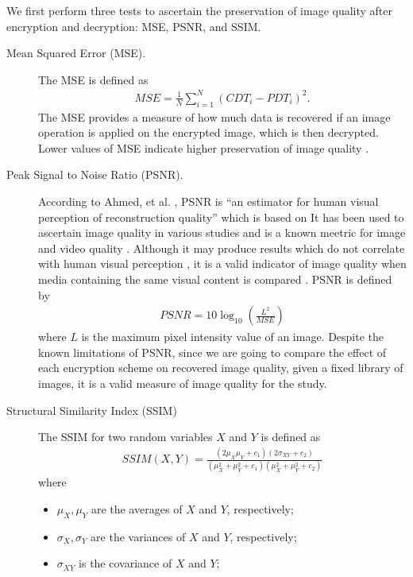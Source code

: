 We first perform three tests to ascertain the preservation of image quality after encryption and decryption: MSE, PSNR, and SSIM.
\begin{description}
	\item [Mean Squared Error (MSE).] The MSE is defined \cite{ahmed_benchmark_2016} as
	\begin{align}
		MSE = \frac{1}{N}\sum_{i=1}^{N}{(CDT_i - PDT_i)^2}.
	\end{align}
	The MSE provides a measure of how much data is recovered if an image operation is applied on the encrypted image, which is then decrypted. Lower values of MSE indicate higher preservation of image quality \cite{ahmed_benchmark_2016, ahmad_efficiency_2012}.
	\item [Peak Signal to Noise Ratio (PSNR).]
	According to Ahmed, et al. \cite{ahmed_benchmark_2016}, PSNR is ``an estimator for human visual perception of reconstruction quality'' which is based on  It has been used to ascertain image quality in various studies and is a known meetric for image and video quality \cite{upmanyu_efficient_2009, ahmed_benchmark_2016, akramullah_video_2014}. Although it may produce results which do not correlate with human visual perception \cite{huynh-thu_accuracy_2012, ahmed_benchmark_2016}, it is a valid indicator of image quality when media containing the same visual content is compared \cite{huynh-thu_accuracy_2012}.
	PSNR is defined by
	\begin{align}
		PSNR = 10\log_{10}{\left( \frac{L^2}{MSE} \right)}
	\end{align}
	where $L$ is the maximum pixel intensity value of an image.
	Despite the known limitations of PSNR, since we are going to compare the effect of each encryption scheme on recovered image quality, given a fixed library of images, it is a valid measure of image quality for the study.
	\item [Structural Similarity Index (SSIM)]
	The SSIM for two random variables $X$ and $Y$ is defined \cite{ahmed_benchmark_2016, akramullah_video_2014} as
	\begin{align}
		SSIM(X,Y) = \frac{(2\mu_X\mu_Y+c_1)(2\sigma_{XY}+c_2)}{(\mu_X^2+\mu_Y^2+c_1)(\mu_X^2+\mu_Y^2+c_2)}
	\end{align}
	where
	\begin{itemize}
		\item $\mu_X, \mu_Y$ are the averages of $X$ and $Y$, respectively;
		\item $\sigma_X, \sigma_Y$ are the variances of $X$ and $Y$, respectively;
		\item $\sigma_{XY}$ is the covariance of $X$ and $Y$;

\end{itemize}
\end{description}
